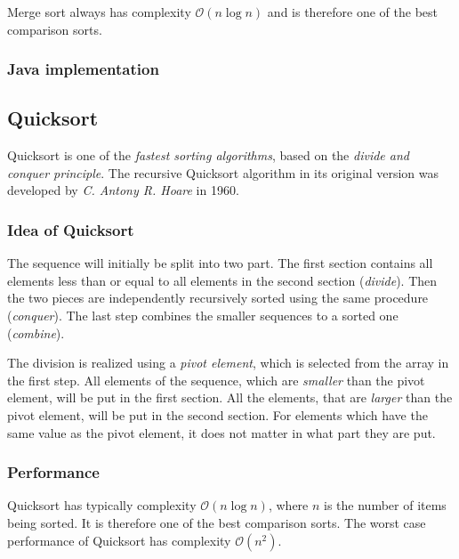 \documentclass[]{pfBook}
\newcommand{\OO}{\mathcal{O}}
\begin{document}
	Merge sort always has complexity $\OO(n \log n)$ and is therefore one of the best comparison sorts.
	
	\subsubsection{Java implementation}
	
	
	
	\subsection{Quicksort}
	
	Quicksort is one of the \emph{fastest sorting algorithms}, based on the \emph{divide and conquer principle}. The recursive Quicksort algorithm in its original version was developed by \emph{C. Antony R. Hoare} in 1960.
	
	\subsubsection{Idea of Quicksort}
	
	The sequence will initially be split into two part. The first section contains all elements less than or equal to all elements in the second section (\emph{divide}). Then the two pieces are independently recursively sorted using the same procedure (\emph{conquer}). The last step combines the smaller sequences to a sorted one (\emph{combine}).
	
	The division is realized using a \emph{pivot element}, which is selected from the array in the first step. All elements of the sequence, which are \emph{smaller} than the pivot element, will be put in the first section. All the elements, that are \emph{larger} than the pivot element, will be put in the second section. For elements which have the same value as the pivot element, it does not matter in what part they are put.
	
	\subsubsection{Performance}
	
	Quicksort has typically complexity $\OO(n \log n)$, where $n$ is the number of items being sorted. It is therefore one of the best comparison sorts. The worst case performance of Quicksort has complexity $\OO(n^2)$.
	
\end{document}

